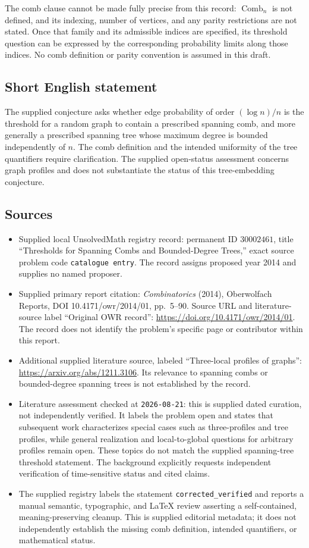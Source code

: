 \documentclass[11pt]{article}
\begin{document}
The comb clause cannot be made fully precise from this record: \(\operatorname{Comb}_n\) is not defined, and its indexing, number of vertices, and any parity restrictions are not stated. Once that family and its admissible indices are specified, its threshold question can be expressed by the corresponding probability limits along those indices. No comb definition or parity convention is assumed in this draft.
\subsection{Short English statement}
The supplied conjecture asks whether edge probability of order \((\log n)/n\) is the threshold for a random graph to contain a prescribed spanning comb, and more generally a prescribed spanning tree whose maximum degree is bounded independently of \(n\). The comb definition and the intended uniformity of the tree quantifiers require clarification. The supplied open-status assessment concerns graph profiles and does not substantiate the status of this tree-embedding conjecture.
\subsection{Sources}
\begin{itemize}
\item Supplied local UnsolvedMath registry record: permanent ID \(30002461\), title ``Thresholds for Spanning Combs and Bounded-Degree Trees,'' exact source problem code \texttt{catalogue entry}. The record assigns proposed year 2014 and supplies no named proposer.
\item Supplied primary report citation: \emph{Combinatorics} (2014), Oberwolfach Reports, DOI 10.4171/owr/2014/01, pp.\ 5--90. Source URL and literature-source label ``Original OWR record'': \url{https://doi.org/10.4171/owr/2014/01}. The record does not identify the problem's specific page or contributor within this report.
\item Additional supplied literature source, labeled ``Three-local profiles of graphs'': \url{https://arxiv.org/abs/1211.3106}. Its relevance to spanning combs or bounded-degree spanning trees is not established by the record.
\item Literature assessment checked at \texttt{2026-08-21}: this is supplied dated curation, not independently verified. It labels the problem open and states that subsequent work characterizes special cases such as three-profiles and tree profiles, while general realization and local-to-global questions for arbitrary profiles remain open. These topics do not match the supplied spanning-tree threshold statement. The background explicitly requests independent verification of time-sensitive status and cited claims.
\item The supplied registry labels the statement \texttt{corrected\_verified} and reports a manual semantic, typographic, and LaTeX review asserting a self-contained, meaning-preserving cleanup. This is supplied editorial metadata; it does not independently establish the missing comb definition, intended quantifiers, or mathematical status.
\end{itemize}
\end{document}
